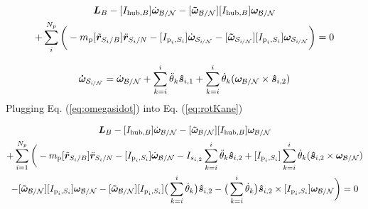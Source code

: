 \begin{multline}
	\bm L_B -[I_{\text{hub},B}] \dot{\bm\omega}_{\cal B/N}  -[\bm{\tilde{\omega}}_{\cal B/N}] [I_{\text{hub},B}] \bm\omega_{\cal B/N}\\ + \sum\limits_{i}^{N_p}\bigg(- m_{\text{p}} [\tilde{{\bm r}}_{S_{i}/B}] \ddot{\bm r}_{S_{i}/N} -[I_{\text{p}_i,S_i}] \dot{\bm\omega}_{\cal S_{\textit{i}/N}}  -[\bm{\tilde{\omega}}_{\cal S_{\textit{i}/N}}] [I_{\text{p}_i,S_i}] \bm\omega_{\cal S_{\textit{i}/N}}\bigg) = 0
	\label{eq:rotKane}
\end{multline}

\begin{equation}
	\bm{\dot{\omega}}_{\cal S_{\textit{i}/N}} = \dot{\bm\omega}_{\cal B/N} + \sum^{i}_{k=i} \ddot{\theta}_k  \bm{\hat{s}}_{i,1} + \sum^{i}_{k=i} \dot{\theta}_k (\bm\omega_{\cal B/N} \times \bm{\hat{s}}_{i,2})
	\label{eq:omegasidot}
\end{equation}
Plugging Eq. (\ref{eq:omegasidot}) into Eq. (\ref{eq:rotKane})

\begin{multline}
	\bm L_B -[I_{\text{hub},B}] \dot{\bm\omega}_{\cal B/N}  -[\bm{\tilde{\omega}}_{\cal B/N}] [I_{\text{hub},B}] \bm\omega_{\cal B/N} \\
	+ \sum\limits_{i=1}^{N_p}\bigg(- m_{\text{p}} [\tilde{{\bm r}}_{S_{i}/B}] \ddot{\bm r}_{S_{i}/N} -[I_{\text{p}_i,S_i}] \dot{\bm\omega}_{\cal B/N} - I_{s_{i,2}} \sum^{i}_{k=i} \ddot{\theta}_k \bm{\hat{s}}_{i,2} + [I_{\text{p}_i,S_i}] \sum^{i}_{k=i} \dot{\theta}_k (\bm{\hat{s}}_{i,2} \times \bm\omega_{\cal B/N}) \\-[\bm{\tilde{\omega}}_{\cal B/N}] [I_{\text{p}_i,S_i}] \bm\omega_{\cal B/N}
	- [\bm{\tilde{\omega}}_{\cal B/N}] [I_{\text{p}_i,S_i}] \big(\sum^{i}_{k=i} \dot{\theta}_k \big) \bm{\hat{s}}_{i,2} -  \big(\sum^{i}_{k=i} \dot{\theta}_k \big) \bm{\hat{s}}_{i,2} \times [I_{\text{p}_i,S_i}] \bm\omega_{\cal B/N} \bigg) = 0
\end{multline}

